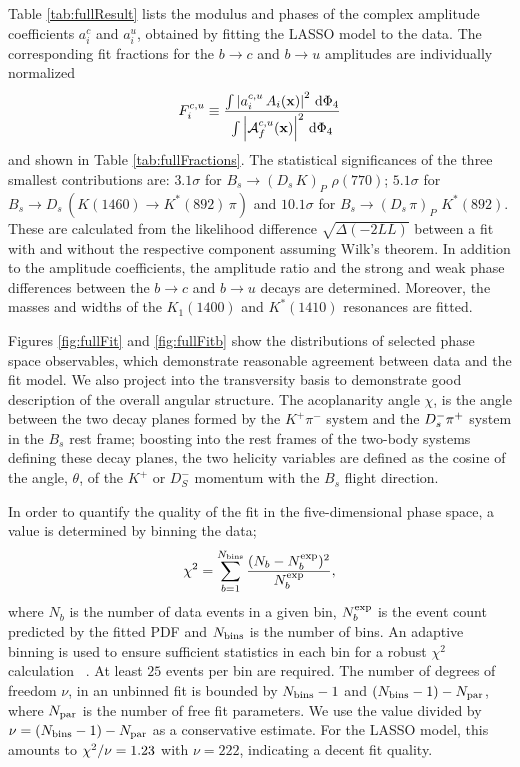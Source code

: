 Table \ref{tab:fullResult} 
lists the modulus and phases of the complex amplitude coefficients $a^c_{i}$ and $a^u_{i}$, 
obtained by fitting the LASSO model to the data.
The corresponding fit fractions for the $b\to c$ and $b\to u$ amplitudes are individually normalized
\begin{equation}
\label{eq:DefineFitFractions}
	F^{c,u}_{i} \equiv \frac{\int \left\vert   a_{i}^{c,u} \, A_{i}(\mathbf{x}) \right\vert^{2} \, \text{d}\Phi_{4} }
	{\int \left\vert  \mathcal A_f^{c,u}(\mathbf{x}) \right\vert^{2} \, \text{d}\Phi_{4}}  
\end{equation}
and shown in Table \ref{tab:fullFractions}.
The statistical significances
 of the three smallest contributions are:
 $3.1\sigma$ for $B_s \to ( D_s \, K)_{P} \, \, \rho(770)$;
 $5.1\sigma$ for $B_s \to D_s \, ( K(1460) \to K^{*}(892) \, \pi )$
 and $10.1\sigma$
for $B_s \to ( D_s \, \pi)_{P} \, \, K^{*}(892)$.
These are calculated from the likelihood difference $\sqrt{\Delta(-2LL)}$ between a fit with and without the respective component assuming Wilk's theorem.
In addition to the amplitude coefficients, the amplitude ratio and the strong and weak phase differences between the $b\to c$ and $b\to u$ decays are determined.
Moreover, the masses and widths of the $K_1(1400)$ and $K^{*}(1410)$ resonances are fitted.

Figures \ref{fig:fullFit} and \ref{fig:fullFitb}  show the distributions of 
selected phase space observables, which demonstrate 
reasonable agreement between data and the fit model. 
We also project into the transversity basis to demonstrate good description of the overall angular structure.
The acoplanarity angle 
${\chi}$, is the angle between the two decay planes formed by 
the $K^+\pi^-$ system and the $D_s^- {{\pi}^+}$ system
in the $B_s$ rest frame; boosting into the rest frames of the two-body systems defining these decay planes,
the two helicity variables 
are defined as the cosine of the angle, ${\theta}$, 
of the $K^+$ or $D_S^-$ momentum with the $B_s$ flight direction.

In order to quantify the quality of the fit in the five-dimensional phase space,
a \chisq value is determined by binning the data;
\begin{equation}
	\chi^{2} = \sum_{b=1}^{N_{\rm bins}} \frac{(N_{b}-N_{b}^{\rm exp})^{2}}{N_{b}^{\rm exp}},
\end{equation}
where $N_{b}$ is the number of data events in a given bin, 
$N_{b}^{\rm exp}$ is the event count predicted by the fitted PDF
and $N_{\rm bins}$ is the number of bins.
An adaptive binning
is used to ensure sufficient statistics in each bin for a robust $\chi^{2}$ calculation ~\cite{KKpipi}.
At least $25$ events per bin are required.
The number of degrees of freedom $\nu$, in an unbinned fit is bounded by $N_{\rm bins}-1$ and $(N_{\rm bins}- 1) - N_{\rm par}$, 
where $N_{\rm par}$ is the number of free fit parameters.
We use the \chisq value divided by $\nu = (N_{\rm bins}-1) - N_{\rm par}$ as a conservative estimate.
For the LASSO model, this 
amounts to $\chi^2/\nu = 1.23$ with $\nu = 222$,
indicating a decent fit quality.

